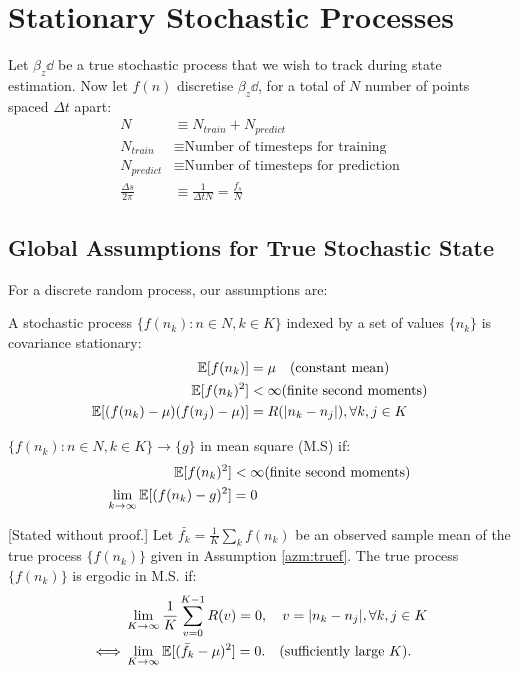 \section{Stationary Stochastic Processes} \label{sec:ap_randomprocess}

Let $\beta_z \dd$ be a true stochastic process that we wish to track during state estimation. Now let $f(n)$ discretise $\beta_z \dd$, for a total of $N$ number of points  spaced $\Delta t$  apart:
\begin{align}
N & \equiv N_{train} + N_{predict} \\ 
N_{train}   &\equiv \text{Number of timesteps for training} \\
N_{predict}  &\equiv \text{Number of timesteps for prediction} \\
\frac{\Delta s}{2\pi} & \equiv \frac{1}{\Delta t N} =  \frac{f_s}{N}
\end{align}
\subsection{Global Assumptions for True Stochastic State}

For a discrete random process, our assumptions are: 

\begin{azm}\label{azm:truef}
	 A stochastic process $\{f(n_k): n\in N, k \in K \}$ indexed by a set of values $\{n_k\}$ is covariance stationary:
	\begin{align}
	\mathbb{E}[f(n_k)] &= \mu \quad \text{(constant mean)} \\
	\mathbb{E}[f(n_k)^2] & < \infty \text{(finite second moments)} \\
	\mathbb{E}[(f(n_k) - \mu)(f(n_j) - \mu)] &= R(|n_k - n_j|), \forall k,j \in K  \label{azm:corrfunc}
	\end{align}
\end{azm}

\begin{defn} \label{dfn:ms} $\{f(n_k): n\in N, k \in K \} \rightarrow \{g\}$ in mean square (M.S) if:
	\begin{align}
	\mathbb{E}[f(n_k)^2] & < \infty \text{(finite second moments)} \\
	\lim_{k \rightarrow \infty}\mathbb{E}[(f(n_k) - g)^2] &= 0
	\end{align}
\end{defn}

\begin{thm} \label{thm:erogodic}
	[Stated without proof.] Let $\bar{f_k} = \frac{1}{K} \sum_k f(n_k)$ be an observed sample mean of the true process $\{f(n_k)\}$ given in Assumption \ref{azm:truef}. The true process $\{f(n_k)\}$ is ergodic in M.S. if:
	\begin{align}
	&\lim_{K \to \infty} \frac{1}{K} \sum_{v=0}^{K-1} R(v) = 0, \quad v = |n_k - n_j|, \forall k,j \in K \\
	\iff &\lim_{K \to \infty} \mathbb{E}[(\bar{f}_k - \mu)^2] = 0.\quad \text{(sufficiently large $K$)}.
	\end{align}
\end{thm}

